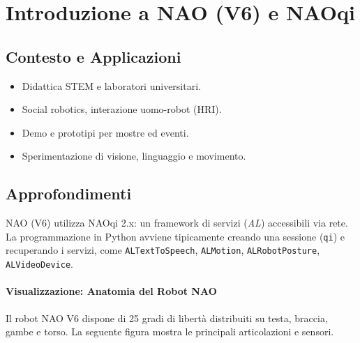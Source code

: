 \chapter{Introduzione a NAO (V6) e NAOqi}

\section{Contesto e Applicazioni}
\begin{tcolorbox}[title=Contesto e Applicazioni]
\begin{itemize}
  \item Didattica STEM e laboratori universitari.
  \item Social robotics, interazione uomo-robot (HRI).
  \item Demo e prototipi per mostre ed eventi.
  \item Sperimentazione di visione, linguaggio e movimento.
\end{itemize}
\end{tcolorbox}

\section{Approfondimenti}
NAO (V6) utilizza NAOqi 2.x: un framework di servizi (\emph{AL\*}) accessibili via rete. La programmazione in Python avviene tipicamente creando una sessione (\texttt{qi}) e recuperando i servizi, come \texttt{ALTextToSpeech}, \texttt{ALMotion}, \texttt{ALRobotPosture}, \texttt{ALVideoDevice}.

\subsubsection{Visualizzazione: Anatomia del Robot NAO}
Il robot NAO V6 dispone di 25 gradi di libertà distribuiti su testa, braccia, gambe e torso. La seguente figura mostra le principali articolazioni e sensori.

